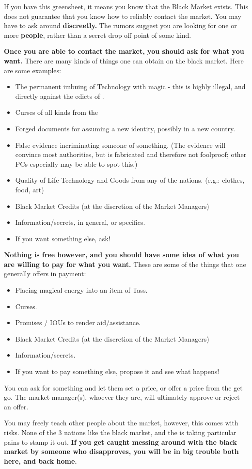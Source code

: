 \documentclass[green]{GL2020}
\begin{document}
\name{\gBMUse{}}

If you have this greensheet, it means you know that the Black Market exists. This does not guarantee that you know how to reliably contact the market. You may have to ask around \textbf{discreetly.} The rumors suggest you are looking for one or more \textbf{people}, rather than a secret drop off point of some kind.

\textbf{Once you are able to contact the market, you should ask for what you want.} There are many kinds of things one can obtain on the black market. Here are some examples:
\begin{itemize}
  \item The permanent imbuing of Technology with magic - this is highly illegal, and directly against the edicts of \cTechGod{}.
  \item Curses of all kinds from the \pFarm{}
  \item Forged documents for assuming a new identity, possibly in a new country.
  \item False evidence incriminating someone of something. (The evidence will convince most authorities, but is fabricated and therefore not foolproof; other PCs especially may be able to spot this.)
  \item Quality of Life Technology and Goods from any of the nations. (e.g.: clothes, food, art)
  \item Black Market Credits (at the discretion of the Market Managers)
  \item Information/secrets, in general, or specifics.
  \item If you want something else, ask!
\end{itemize}

\textbf{Nothing is free however, and you should have some idea of what you are willing to pay for what you want.} These are some of the things that one generally offers in payment:
\begin{itemize}
  \item Placing magical energy into an item of Tass.
  \item Curses.
  \item Promises / IOUs to render aid/assistance.
  \item Black Market Credits (at the discretion of the Market Managers)
  \item Information/secrets.
  \item If you want to pay something else, propose it and see what happens!
\end{itemize}

You can ask for something and let them set a price, or offer a price from the get go. The market manager(s), whoever they are, will ultimately approve or reject an offer.

You may freely teach other people about the market, however, this comes with risks. None of the 3 nations like the black market, and the \pTech{} is taking particular pains to stamp it out. \textbf{If you get caught messing around with the black market by someone who disapproves, you will be in big trouble both here, and back home.}
\end{document}
